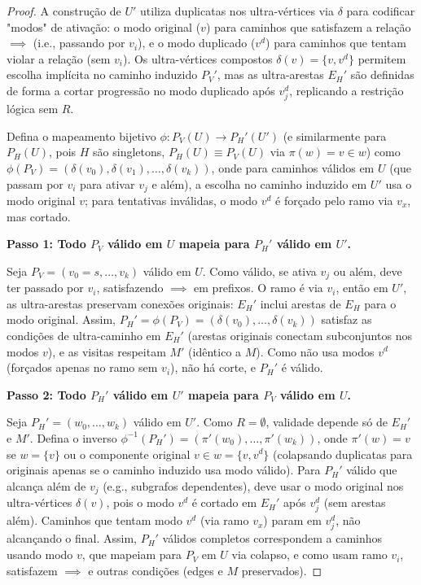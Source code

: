 \documentclass{article}
\begin{document}
\begin{proof}
A construção de \( U' \) utiliza duplicatas nos ultra-vértices via \( \delta \) para codificar "modos" de ativação: o modo original (\( v \)) para caminhos que satisfazem a relação \( \implies \) (i.e., passando por \( v_i \)), e o modo duplicado (\( v^d \)) para caminhos que tentam violar a relação (sem \( v_i \)). Os ultra-vértices compostos \( \delta(v) = \{v, v^d\} \) permitem escolha implícita no caminho induzido \( P_V' \), mas as ultra-arestas \( E_H' \) são definidas de forma a cortar progressão no modo duplicado após \( v_j^d \), replicando a restrição lógica sem \( R \).

Defina o mapeamento bijetivo \( \phi: P_V(U) \to P_H'(U') \) (e similarmente para \( P_H(U) \), pois \( H \) são singletons, \( P_H(U) \equiv P_V(U) \) via \( \pi(w) = v \in w \)) como \( \phi(P_V) = (\delta(v_0), \delta(v_1), \dots, \delta(v_k)) \), onde para caminhos válidos em \( U \) (que passam por \( v_i \) para ativar \( v_j \) e além), a escolha no caminho induzido em \( U' \) usa o modo original \( v \); para tentativas inválidas, o modo \( v^d \) é forçado pelo ramo via \( v_x \), mas cortado.

\textbf{Passo 1: Todo \( P_V \) válido em \( U \) mapeia para \( P_H' \) válido em \( U' \).}

Seja \( P_V = (v_0 = s, \dots, v_k) \) válido em \( U \). Como válido, se ativa \( v_j \) ou além, deve ter passado por \( v_i \), satisfazendo \( \implies \) em prefixos. O ramo é via \( v_i \), então em \( U' \), as ultra-arestas preservam conexões originais: \( E_H' \) inclui arestas de \( E_H \) para o modo original. Assim, \( P_H' = \phi(P_V) = (\delta(v_0), \dots, \delta(v_k)) \) satisfaz as condições de ultra-caminho em \( E_H' \) (arestas originais conectam subconjuntos nos modos \( v \)), e as visitas respeitam \( M' \) (idêntico a \( M \)). Como não usa modos \( v^d \) (forçados apenas no ramo sem \( v_i \)), não há corte, e \( P_H' \) é válido.

\textbf{Passo 2: Todo \( P_H' \) válido em \( U' \) mapeia para \( P_V \) válido em \( U \).}

Seja \( P_H' = (w_0, \dots, w_k) \) válido em \( U' \). Como \( R = \emptyset \), validade depende só de \( E_H' \) e \( M' \). Defina o inverso \( \phi^{-1}(P_H') = (\pi'(w_0), \dots, \pi'(w_k)) \), onde \( \pi'(w) = v \) se \( w = \{v\} \) ou o componente original \( v \in w = \{v, v^d\} \) (colapsando duplicatas para originais apenas se o caminho induzido usa modo válido). Para \( P_H' \) válido que alcança além de \( v_j \) (e.g., subgrafos dependentes), deve usar o modo original nos ultra-vértices \( \delta(v) \), pois o modo \( v^d \) é cortado em \( E_H' \) após \( v_j^d \) (sem arestas além). Caminhos que tentam modo \( v^d \) (via ramo \( v_x \)) param em \( v_j^d \), não alcançando o final. Assim, \( P_H' \) válidos completos correspondem a caminhos usando modo \( v \), que mapeiam para \( P_V \) em \( U \) via colapso, e como usam ramo \( v_i \), satisfazem \( \implies \) e outras condições (edges e \( M \) preservados).
\newpage


\end{proof}
\end{document}
